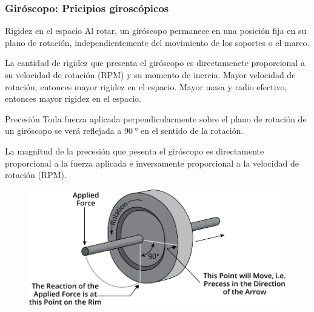 \begin{frame}
    \frametitle{Giróscopo: Pricipios giroscópicos}
    \footnotesize

    \begin{block}{Rigidez en el espacio}
        Al rotar, un giróscopo permanece en una posición fija en su plano de rotación, independientemente del movimiento de los soportes o el marco.

        La cantidad de rigidez que presenta el giróscopo es directamenete proporcional a su velocidad de rotación (RPM) y su momento de inercia.
        Mayor velocidad de rotación, entonces mayor rigidez en el espacio.
        Mayor masa y radio efectivo, entonces mayor rigidez en el espacio.
    \end{block}

    \begin{block}{Precesión}
    Toda fuerza aplicada perpendicularmente sobre el plano de rotación de un giróscopo se verá reflejada a $\SI{90}{\degree}$ en el sentido de la rotación.

    La magnitud de la precesión que pesenta el giróscopo es directamente proporcional a la fuerza aplicada e inversamente proporcional a la velocidad de rotación (RPM).

    \begin{figure}[!h]
        \centering
        \includegraphics[width=0.4\columnwidth]{images/gyroscope_precession.pdf}
    \end{figure}
\end{block}

\end{frame}


